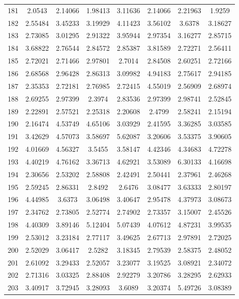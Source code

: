 \begin{center}
\begin{longtable}{cccccccc}
181 & 2.0543 & 2.14066 & 1.98413 & 3.11636 & 2.14066 & 2.21963 & 1.9259\\
182 & 2.55484 & 3.45233 & 3.19929 & 4.11423 & 3.56102 & 3.6378 & 3.18627\\
183 & 2.73085 & 3.01295 & 2.91322 & 3.95944 & 2.97354 & 3.16277 & 2.85715\\
184 & 3.68822 & 2.76544 & 2.84572 & 2.85387 & 3.81589 & 2.72271 & 2.56411\\
185 & 2.72021 & 2.71466 & 2.97801 & 2.7014 & 2.84508 & 2.60251 & 2.72166\\
186 & 2.68568 & 2.96428 & 2.86313 & 3.09982 & 4.94183 & 2.75617 & 2.94185\\
187 & 2.35353 & 2.72181 & 2.76985 & 2.72415 & 4.55019 & 2.56909 & 2.68974\\
188 & 2.69255 & 2.97399 & 2.3974 & 2.83536 & 2.97399 & 2.98741 & 2.52845\\
189 & 2.22891 & 2.57521 & 2.25318 & 2.20608 & 2.4799 & 2.58241 & 2.15194\\
190 & 2.16474 & 4.53749 & 4.65106 & 3.03929 & 2.41595 & 3.36285 & 3.03585\\
191 & 3.42629 & 4.57073 & 3.58697 & 5.62087 & 3.20606 & 3.53375 & 3.90605\\
192 & 4.01669 & 4.56327 & 3.5455 & 3.58147 & 4.42346 & 4.34683 & 4.72278\\
193 & 4.40219 & 4.76162 & 3.36713 & 4.62921 & 3.53089 & 6.30133 & 4.16698\\
194 & 2.30656 & 2.53202 & 2.58808 & 2.42491 & 2.50441 & 2.37961 & 2.46268\\
195 & 2.59245 & 2.86331 & 2.8492 & 2.6476 & 3.08477 & 3.63333 & 2.80197\\
196 & 4.44985 & 3.6373 & 3.06498 & 3.40647 & 2.95478 & 4.37973 & 3.08673\\
197 & 2.34762 & 2.73805 & 2.52774 & 2.74902 & 2.73357 & 3.15007 & 2.45526\\
198 & 4.40309 & 3.89146 & 5.12404 & 5.07439 & 4.07612 & 4.87231 & 3.99535\\
199 & 2.53012 & 3.23184 & 2.77117 & 3.49625 & 2.67713 & 2.97891 & 2.72025\\
200 & 2.52029 & 3.06417 & 2.5282 & 3.18345 & 2.79539 & 2.58375 & 2.48052\\
201 & 2.61092 & 3.29433 & 2.52057 & 3.23077 & 3.19525 & 3.08921 & 2.34072\\
202 & 2.71316 & 3.03325 & 2.88408 & 2.92279 & 3.20786 & 3.28295 & 2.62933\\
203 & 3.40917 & 3.72945 & 3.28093 & 3.6089 & 3.20374 & 5.49726 & 3.08389\\

\end{longtable}
\end{center}
